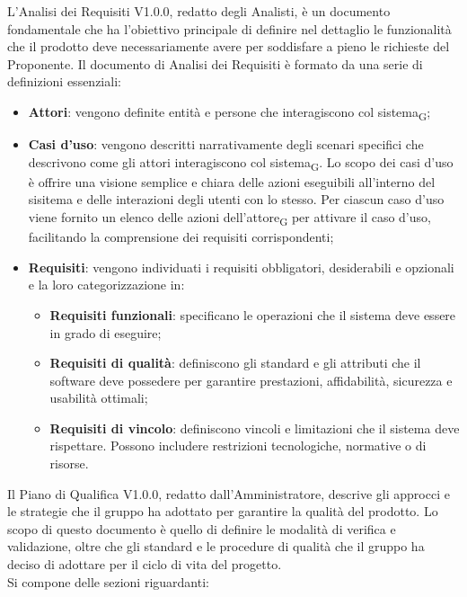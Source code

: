 L'Analisi dei Requisiti V1.0.0, redatto degli Analisti, è un documento fondamentale che ha l'obiettivo principale di definire nel dettaglio le funzionalità che il prodotto deve necessariamente avere per soddisfare a pieno le richieste del Proponente. 
Il documento di Analisi dei Requisiti è formato da una serie di definizioni essenziali:
\begin{itemize}
    \item \textbf{Attori}: vengono definite entità e persone che interagiscono col sistema\textsubscript{G};
    \item \textbf{Casi d'uso}: vengono descritti narrativamente degli scenari specifici che descrivono come gli attori interagiscono col sistema\textsubscript{G}. Lo scopo dei casi d'uso è offrire una visione semplice e chiara delle azioni eseguibili all'interno del sisitema e delle interazioni degli utenti con lo stesso. Per ciascun caso d'uso viene fornito un elenco delle azioni dell'attore\textsubscript{G} per attivare il caso d'uso, facilitando la comprensione dei requisiti corrispondenti;
    \item \textbf{Requisiti}: vengono individuati i requisiti obbligatori, desiderabili e opzionali e la loro categorizzazione in: 
    \begin{itemize}
        \item \textbf{Requisiti funzionali}: specificano le operazioni che il sistema deve essere in grado di eseguire; 
        \item \textbf{Requisiti di qualità}: definiscono gli standard e gli attributi che il software deve possedere per garantire prestazioni, affidabilità, sicurezza e usabilità ottimali;
        \item \textbf{Requisiti di vincolo}: definiscono vincoli e limitazioni che il sistema deve rispettare. Possono includere restrizioni tecnologiche, normative o di risorse.
    \end{itemize}
\end{itemize}
Il Piano di Qualifica V1.0.0, redatto dall'Amministratore, descrive gli approcci e le strategie che il gruppo ha adottato per garantire la qualità del prodotto. Lo scopo di questo documento è quello di definire le modalità di verifica e validazione, oltre che gli standard e le procedure di qualità che il gruppo ha deciso di adottare per il ciclo di vita del progetto. \\ 
Si compone delle sezioni riguardanti:
